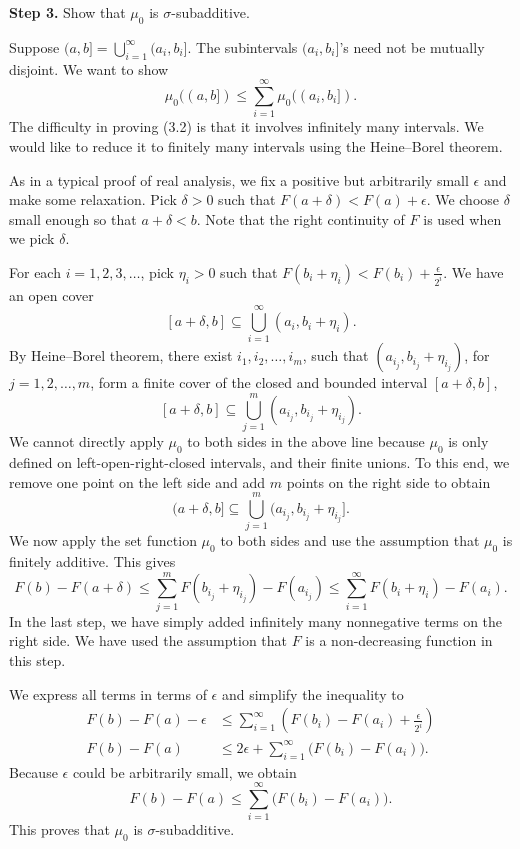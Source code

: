 \textbf{Step 3.} Show that $\mu_0$ is $\sigma$-subadditive.

Suppose $(a, b] = \bigcup_{i=1}^\infty (a_i, b_i]$. The subintervals $(a_i, b_i]$'s need not be mutually disjoint. We want to show
\begin{equation}
\mu_0((a, b]) \le \sum_{i=1}^\infty \mu_0((a_i, b_i]). \tag{3.2}
\end{equation}
The difficulty in proving (3.2) is that it involves infinitely many intervals. We would like to reduce it to finitely many intervals using the Heine--Borel theorem.


As in a typical proof of real analysis, we fix a positive but arbitrarily small $\epsilon$ and make some relaxation. Pick $\delta > 0$ such that $F(a + \delta) < F(a) + \epsilon$. We choose $\delta$ small enough so that $a + \delta < b$. Note that the right continuity of $F$ is used when we pick $\delta$.

For each $i = 1, 2, 3, \dots$, pick $\eta_i > 0$ such that $F(b_i + \eta_i) < F(b_i) + \frac{\epsilon}{2^i}$. We have an open cover
\[
[a + \delta, b] \subseteq \bigcup_{i=1}^\infty (a_i, b_i + \eta_i).
\]
By Heine--Borel theorem, there exist $i_1, i_2, \dots, i_m$, such that $(a_{i_j}, b_{i_j} + \eta_{i_j})$, for $j = 1, 2, \dots, m$, form a finite cover of the closed and bounded interval $[a + \delta, b]$,
\[
[a + \delta, b] \subseteq \bigcup_{j=1}^m (a_{i_j}, b_{i_j} + \eta_{i_j}).
\]
We cannot directly apply $\mu_0$ to both sides in the above line because $\mu_0$ is only defined on left-open-right-closed intervals, and their finite unions. To this end, we remove one point on the left side and add $m$ points on the right side to obtain
\[
(a + \delta, b] \subseteq \bigcup_{j=1}^m (a_{i_j}, b_{i_j} + \eta_{i_j}].
\]
We now apply the set function $\mu_0$ to both sides and use the assumption that $\mu_0$ is finitely additive. This gives
\[
F(b) - F(a + \delta) \le \sum_{j=1}^m F(b_{i_j} + \eta_{i_j}) - F(a_{i_j}) \le \sum_{i=1}^\infty F(b_i + \eta_i) - F(a_i).
\]
In the last step, we have simply added infinitely many nonnegative terms on the right side. We have used the assumption that $F$ is a non-decreasing function in this step.

We express all terms in terms of $\epsilon$ and simplify the inequality to
\begin{align*}
F(b) - F(a) - \epsilon &\le \sum_{i=1}^\infty \left( F(b_i) - F(a_i) + \frac{\epsilon}{2^i} \right) \\
F(b) - F(a) &\le 2\epsilon + \sum_{i=1}^\infty \big( F(b_i) - F(a_i) \big).
\end{align*}
Because $\epsilon$ could be arbitrarily small, we obtain
\[
F(b) - F(a) \le \sum_{i=1}^\infty \big( F(b_i) - F(a_i) \big).
\]
This proves that $\mu_0$ is $\sigma$-subadditive.

